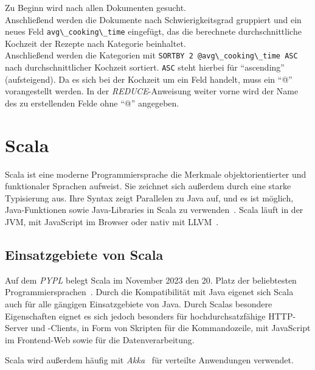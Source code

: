 Zu Beginn wird nach allen Dokumenten gesucht.\\
Anschließend werden die Dokumente nach Schwierigkeitsgrad gruppiert und ein neues Feld \lstinline|avg\_cooking\_time| eingefügt, das die berechnete durchschnittliche Kochzeit der Rezepte nach Kategorie beinhaltet.\\
Anschließend werden die Kategorien mit \lstinline|SORTBY 2 @avg\_cooking\_time ASC| nach durchschnittlicher Kochzeit sortiert.
\lstinline|ASC| steht hierbei für \enquote{ascending} (aufsteigend). Da es sich  bei der Kochzeit um ein Feld handelt, muss ein \enquote{@} vorangestellt werden. In der \emph{REDUCE}-Anweisung weiter vorne wird der Name des zu erstellenden Felde ohne \enquote{@} angegeben.





















\section{Scala} %
Scala ist eine moderne Programmiersprache die Merkmale objektorientierter und funktionaler Sprachen aufweist.
Sie zeichnet sich außerdem durch eine starke Typisierung aus.
Ihre Syntax zeigt Parallelen zu Java auf, und es ist möglich, Java-Funktionen sowie Java-Libraries in Scala zu verwenden~\cite{epfl_scala_nodate-1, epfl_introduction_nodate}.
Scala läuft in der JVM, mit JavaScript im Browser oder nativ mit LLVM~\cite{epfl_scala_nodate}.

\subsection{Einsatzgebiete von Scala}
Auf dem \emph{\acf{PYPL}} belegt Scala im November 2023 den 20. Platz der beliebtesten Programmiersprachen~\cite{carbonnelle_pypl_2023}.
Durch die Kompatibilität mit Java eigenet sich Scala auch für alle gängigen Einsatzgebiete von Java. 
Durch Scalas besondere Eigenschaften eignet es sich jedoch besonders für hochdurchsatzfähige HTTP-Server und -Clients, in Form von Skripten für die Kommandozeile, mit JavaScript im Frontend-Web sowie für die Datenverarbeitung.

Scala wird außerdem häufig mit \emph{Akka}~\cite{lightbend_akka_nodate} für verteilte Anwendungen verwendet.

